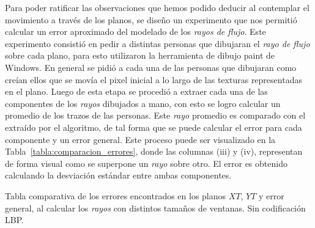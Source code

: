 Para poder ratificar las observaciones que hemos podido deducir al contemplar el movimiento a través de los planos, se diseño un experimento que nos permitió calcular un error aproximado del modelado de los \textit{rayos de flujo}. Este experimento consistió en pedir a distintas personas que dibujaran el \textit{rayo de flujo} sobre cada plano, para esto utilizaron la herramienta de dibujo paint de Windows. En general se pidió a cada una de las personas que dibujaran como creían ellos que se movía el pixel inicial a lo largo de las texturas representadas en el plano. Luego de esta etapa se procedió a extraer cada una de las componentes de los \textit{rayos} dibujados a mano, con esto se logro calcular un promedio de los trazos de las personas. Este \textit{rayo} promedio es comparado con el extraído por el algoritmo, de tal forma que se puede calcular el error para cada componente y un error general. Este proceso puede ser visualizado en la Tabla~\ref{tabla:comparacion_errores}, donde las columnas (iii) y (iv), representan de forma visual como se superpone un \textit{rayo} sobre otro. El error es obtenido calculando la desviación estándar entre ambas componentes. 


\begin{table}[tb]
	\centering
	\caption{Tabla comparativa de los errores encontrados en los planos $XT$, $YT$ y error general, al calcular los \textit{rayos} con distintos tamaños de ventanas. Sin codificación LBP.}
	\label{tabla:error_no_lbp}
\end{table}

